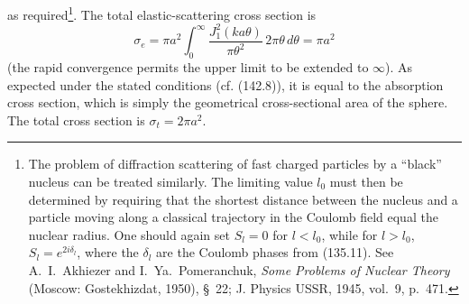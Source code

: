 as required\footnote{The problem of diffraction scattering of fast charged particles by a ``black'' nucleus can be treated similarly. The limiting value $l_0$ must then be determined by requiring that the shortest distance between the nucleus and a particle moving along a classical trajectory in the Coulomb field equal the nuclear radius. One should again set $S_l=0$ for $l<l_0$, while for $l>l_0$, $S_l=e^{2i\delta_l}$, where the $\delta_l$ are the Coulomb phases from (135.11). See A.~I.~Akhiezer and I.~Ya.~Pomeranchuk, \emph{Some Problems of Nuclear Theory} (Moscow: Gostekhizdat, 1950), §~22; J. Physics USSR, 1945, vol.~9, p.~471.}. The total elastic-scattering cross section is
\[
 \sigma_e=\pi a^2\int_0^\infty\frac{J_1^2(ka\theta)}{\pi\theta^2}\,2\pi\theta\,d\theta=\pi a^2
\]
(the rapid convergence permits the upper limit to be extended to $\infty$). As expected under the stated conditions (cf. (142.8)), it is equal to the absorption cross section, which is simply the geometrical cross-sectional area of the sphere. The total cross section is $\sigma_t=2\pi a^2$.
